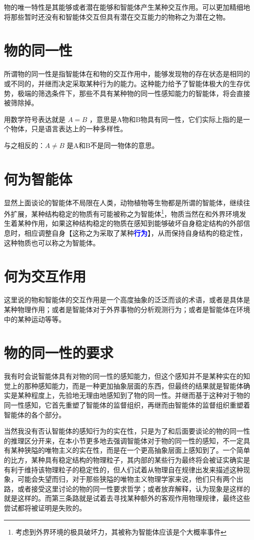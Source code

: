 \documentclass[12pt,oneside]{book}
\renewcommand{\emph}[1]{\textcolor{blue}{\textbf{#1}}}
\begin{document}
物的唯一特性是其能够或者潜在能够和智能体产生某种交互作用。可以更加精细地将那些暂时还没有和智能体交互但具有潜在交互能力的物称之为潜在之物。

\section{物的同一性}
所谓物的同一性是指智能体在和物的交互作用中，能够发现物的存在状态是相同的或不同的，并继而决定采取某种行为的能力。这种能力给予了智能体极大的生存优势，极端的筛选条件下，那些不具有某种物的同一性感知能力的智能体，将会直接被筛除掉。

用数学符号表达就是 $A=B$ ，意思是A物和B物具有同一性，它们实际上指的是一个物体，只是语言表达上的一种多样性。

与之相反的：$A \neq B$ 是A和B不是同一物体的意思。


\section{何为智能体}
显然上面谈论的智能体不局限在人类，动物植物等生物都是所谓的智能体，继续往外扩展，某种结构稳定的物质有可能被称之为智能体\footnote{考虑到外界环境的极具破坏力，其被称为智能体应该是个大概率事件}，物质当然在和外界环境发生着某种作用，如果这种结构稳定的物质在感知到能够破坏自身稳定结构的外部信息时，相应调整自身【这称之为采取了某种\emph{行为}】，从而保持自身结构的稳定性，这种物质也可以称之为智能体。


\section{何为交互作用}
这里说的物和智能体的交互作用是一个高度抽象的泛泛而谈的术语，或者是具体是某种物理作用；或者是智能体对于外界事物的分析观测行为；或者是智能体在环境中的某种运动等等。


\section{物的同一性的要求}
我有时会说智能体具有对物的同一性的感知能力，但这个感知并不是某种实在的知觉上的那种感知能力，而是一种更加抽象层面的东西，但最终的结果就是智能体确实是某种程度上，先验地无理由地感知到了物的同一性。并继而基于这种对于物的同一性感知，它首先重塑了智能体的监督组织，再继而由智能体的监督组织重塑着智能体的各个部分。

当然我没有否认智能体的感知行为的实在性，只是为了和后面要谈论的物的同一性的推理区分开来，在本小节更多地去强调智能体对于物的同一性的感知，不一定具有某种狭隘的唯物主义的实在性，而是在一个更高抽象层面上感知到了。一个简单的比方，某种具有稳定结构的物理粒子，其内部的某些行为最终将会被证实确实是有利于维持该物理粒子的稳定性的，但人们试着从物理自在规律出发来描述这种现象，可能会失望而归，对于那些狭隘的唯物主义物理学家来说，他们只有两个出路，或者接受这里讨论的物的同一性要求哲学；或者放弃解释，认为现象是这样的就是这样的。而第三条路就是试着去寻找某种额外的客观作用物理规律，最终这些尝试都将被证明是失败的。
\end{document}
